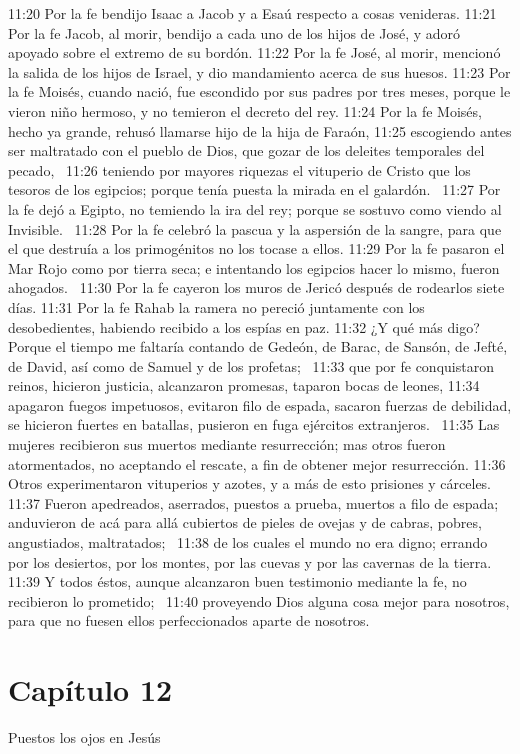 11:20 Por la fe bendijo Isaac a Jacob y a Esaú respecto a cosas venideras. 
11:21 Por la fe Jacob, al morir, bendijo a cada uno de los hijos de José, y adoró apoyado sobre el extremo de su bordón. 
11:22 Por la fe José, al morir, mencionó la salida de los hijos de Israel, y dio mandamiento acerca de sus huesos. 
11:23 Por la fe Moisés, cuando nació, fue escondido por sus padres por tres meses, porque le vieron niño hermoso, y no temieron el decreto del rey. 
11:24 Por la fe Moisés, hecho ya grande, rehusó llamarse hijo de la hija de Faraón, 
11:25 escogiendo antes ser maltratado con el pueblo de Dios, que gozar de los deleites temporales del pecado,  
11:26 teniendo por mayores riquezas el vituperio de Cristo que los tesoros de los egipcios; porque tenía puesta la mirada en el galardón.  
11:27 Por la fe dejó a Egipto, no temiendo la ira del rey; porque se sostuvo como viendo al Invisible.  
11:28 Por la fe celebró la pascua y la aspersión de la sangre, para que el que destruía a los primogénitos no los tocase a ellos. 
11:29 Por la fe pasaron el Mar Rojo como por tierra seca; e intentando los egipcios hacer lo mismo, fueron ahogados.  
11:30 Por la fe cayeron los muros de Jericó después de rodearlos siete días. 
11:31 Por la fe Rahab la ramera no pereció juntamente con los desobedientes, habiendo recibido a los espías en paz. 
11:32 ¿Y qué más digo? Porque el tiempo me faltaría contando de Gedeón, de Barac, de Sansón, de Jefté, de David, así como de Samuel y de los profetas;  
11:33 que por fe conquistaron reinos, hicieron justicia, alcanzaron promesas, taparon bocas de leones, 
11:34 apagaron fuegos impetuosos, evitaron filo de espada, sacaron fuerzas de debilidad, se hicieron fuertes en batallas, pusieron en fuga ejércitos extranjeros.  
11:35 Las mujeres recibieron sus muertos mediante resurrección; mas otros fueron atormentados, no aceptando el rescate, a fin de obtener mejor resurrección. 
11:36 Otros experimentaron vituperios y azotes, y a más de esto prisiones y cárceles. 
11:37 Fueron apedreados, aserrados, puestos a prueba, muertos a filo de espada; anduvieron de acá para allá cubiertos de pieles de ovejas y de cabras, pobres, angustiados, maltratados;  
11:38 de los cuales el mundo no era digno; errando por los desiertos, por los montes, por las cuevas y por las cavernas de la tierra.  
11:39 Y todos éstos, aunque alcanzaron buen testimonio mediante la fe, no recibieron lo prometido;  
11:40 proveyendo Dios alguna cosa mejor para nosotros, para que no fuesen ellos perfeccionados aparte de nosotros.  
\section*{Capítulo 12 }
Puestos los ojos en Jesús  

